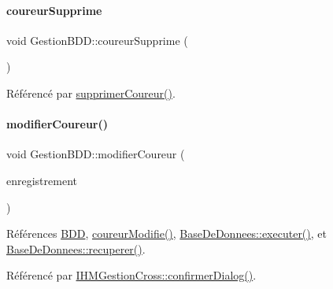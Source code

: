 \paragraph{\texorpdfstring{coureur\+Supprime}{coureurSupprime}}
{\footnotesize\ttfamily void Gestion\+B\+D\+D\+::coureur\+Supprime (\begin{DoxyParamCaption}{ }\end{DoxyParamCaption})\hspace{0.3cm}{\ttfamily [signal]}}



Référencé par \hyperlink{class_gestion_b_d_d_afe47ec92274b7998131c5d4e6551d177}{supprimer\+Coureur()}.

\mbox{\label{class_gestion_b_d_d_afad096d7e405d35a818d4858ee34df61}} 
\paragraph{\texorpdfstring{modifier\+Coureur()}{modifierCoureur()}}
{\footnotesize\ttfamily void Gestion\+B\+D\+D\+::modifier\+Coureur (\begin{DoxyParamCaption}\item[{Q\+String\+List}]{enregistrement }\end{DoxyParamCaption})}



Références \hyperlink{class_gestion_b_d_d_a1bd17cbf5754eb6e54ae351f1d02dca2}{B\+DD}, \hyperlink{class_gestion_b_d_d_a911c1e7a4d8bc38566512db37b13c9f0}{coureur\+Modifie()}, \hyperlink{class_base_de_donnees_aa8de5f8f8bb17edc43f5c0ee33712081}{Base\+De\+Donnees\+::executer()}, et \hyperlink{class_base_de_donnees_a77539baad389f5acf754cd2cd452403e}{Base\+De\+Donnees\+::recuperer()}.



Référencé par \hyperlink{class_i_h_m_gestion_cross_a144933ab31ae263be7267b93bfd53a82}{I\+H\+M\+Gestion\+Cross\+::confirmer\+Dialog()}.


